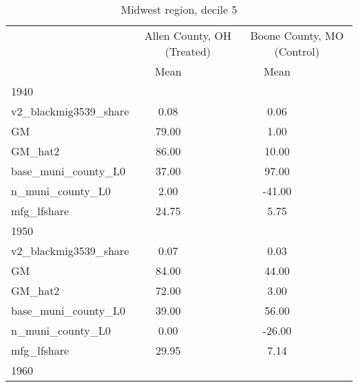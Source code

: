 \begin{table}[htbp]\centering
\def\sym#1{\ifmmode^{#1}\else\(^{#1}\)\fi}
\caption{Midwest region, decile 5 \label{tab1}}
\begin{tabular}{l*{2}{ccc}}
\toprule
                    &\multicolumn{3}{c}{Allen County, OH (Treated)}&\multicolumn{3}{c}{Boone County, MO (Control)}\\
                    &        Mean&            &            &        Mean&            &            \\
\midrule
1940                &            &            &            &            &            &            \\
v2\_blackmig3539\_share&        0.08&            &            &        0.06&            &            \\
GM                  &       79.00&            &            &        1.00&            &            \\
GM\_hat2             &       86.00&            &            &       10.00&            &            \\
base\_muni\_county\_L0 &       37.00&            &            &       97.00&            &            \\
n\_muni\_county\_L0    &        2.00&            &            &      -41.00&            &            \\
mfg\_lfshare         &       24.75&            &            &        5.75&            &            \\
\midrule
1950                &            &            &            &            &            &            \\
v2\_blackmig3539\_share&        0.07&            &            &        0.03&            &            \\
GM                  &       84.00&            &            &       44.00&            &            \\
GM\_hat2             &       72.00&            &            &        3.00&            &            \\
base\_muni\_county\_L0 &       39.00&            &            &       56.00&            &            \\
n\_muni\_county\_L0    &        0.00&            &            &      -26.00&            &            \\
mfg\_lfshare         &       29.95&            &            &        7.14&            &            \\
\midrule
1960                &            &            &            &            &            &            \\

\end{tabular}
\end{table}
